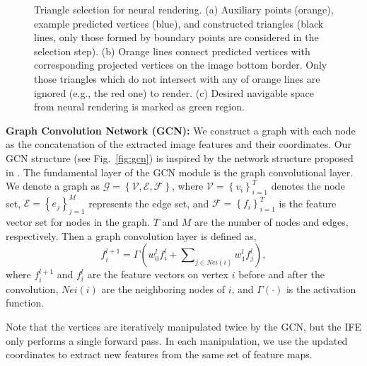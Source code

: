\documentclass[letterpaper, 10 pt, journal, twoside]{ieeetran}
\begin{document}
\begin{figure} \vspace{7pt}
{
  \centering
  \caption{\small Triangle selection for neural rendering. (a) Auxiliary points (orange), example predicted vertices (blue), and constructed triangles (black lines, only those formed by boundary points are considered in the selection step). (b) Orange lines connect predicted vertices with corresponding projected vertices on the image bottom border. Only those triangles which do not intersect with any of orange lines are ignored (e.g., the red one) to render. (c) Desired navigable space from neural rendering is marked as green region. 
  }
\label{fig:nr}  
}
\end{figure}

\textbf{Graph Convolution Network (GCN):}
We construct a graph with each node as the concatenation of the extracted image features and their coordinates. Our GCN structure (see Fig.~\ref{fig:gcn}) is inspired by the network structure proposed in \cite{wang2018pixel2mesh, ling2019fast}.  
The fundamental layer of the GCN module is the graph convolutional layer. We denote a graph as $\mathcal{G}=\left \{ \mathcal{V}, \mathcal{E}, \mathcal{F} \right \}$, where $\mathcal{V} = \left \{ v_i \right \}_{i=1}^{T}$ denotes the node set, 
$\mathcal{E}=\left \{ e_j \right \}_{j=1}^{M}$ represents the edge set, and $\mathcal{F}=\left \{ f_i \right \}_{i=1}^{T}$ is the feature vector set for nodes in the graph. $T$ and $M$ are the number of nodes and edges, respectively. Then a graph convolution layer is defined as,
\begin{equation}
    \label{eq:gcn_layer}
    f_i^{l+1} = \Gamma(w_0^l f_i^l + \sum\nolimits_{j\in Nei(i)} w_1^l f_j^l),
\end{equation}
where $f_i^{l+1}$ and $f_i^l$ are the feature vectors on vertex $i$ before and after the convolution, $Nei(i)$ are the neighboring nodes of $i$, and $\Gamma(\cdot)$ is the activation function. 

Note that the vertices are iteratively manipulated twice by the GCN, but the IFE only performs a single forward pass. In each manipulation, we use the updated coordinates to extract new features from the same set of feature maps.
\end{document}
